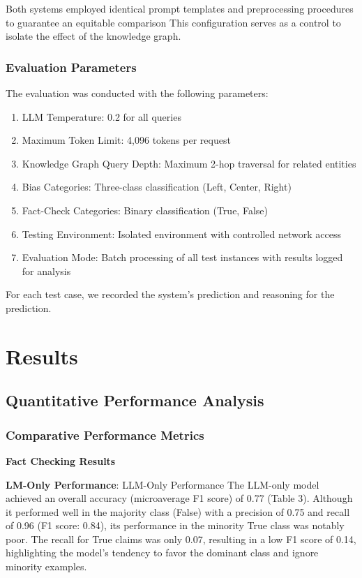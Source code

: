 \documentclass[11pt]{article}
\begin{document}
Both systems employed identical prompt templates and preprocessing procedures to guarantee an equitable comparison This configuration serves as a control to isolate the effect of the knowledge graph.

\subsubsection{Evaluation Parameters}
The evaluation was conducted with the following parameters:
\begin{enumerate}
    \item LLM Temperature: 0.2 for all queries 
    \item Maximum Token Limit: 4,096 tokens per request
    \item Knowledge Graph Query Depth: Maximum 2-hop traversal for related entities
    \item Bias Categories: Three-class classification (Left, Center, Right)
    \item Fact-Check Categories: Binary classification (True, False) 
    \item Testing Environment: Isolated environment with controlled network access
    \item Evaluation Mode: Batch processing of all test instances with results logged for analysis
\end{enumerate}
For each test case, we recorded the system’s prediction and reasoning for the prediction. 

\section{Results}
\subsection{Quantitative Performance Analysis}
\subsubsection{Comparative Performance Metrics}

\textbf{Fact Checking Results} 

\textbf{LM-Only Performance}: LLM-Only Performance The LLM-only model achieved an overall accuracy (microaverage F1 score) of 0.77 (Table 3). Although it performed well in the majority class (False) with a precision of 0.75 and recall of 0.96 (F1 score: 0.84), its performance in the minority True class was notably poor. The recall for True claims was only 0.07, resulting in a low F1 score of 0.14, highlighting the model’s tendency to favor the dominant class and ignore minority examples.
 
\end{document}
